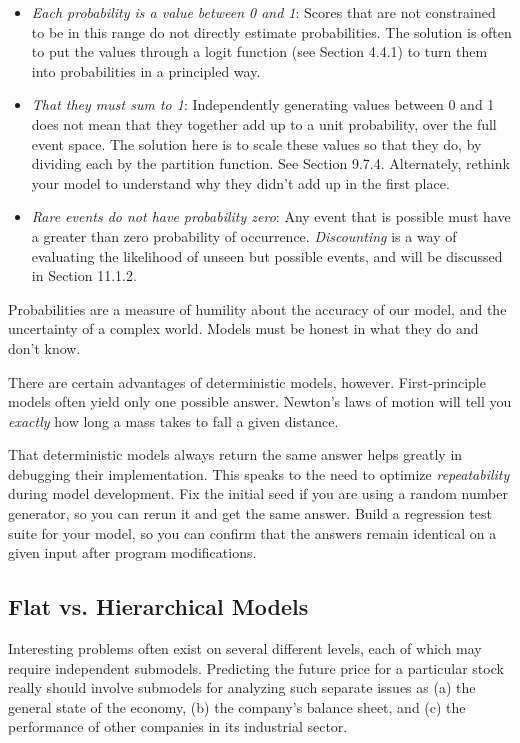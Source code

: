 \documentclass[10pt]{article}
\begin{document}
\begin{itemize}
  \item \textit{Each probability is a value between 0 and 1}: Scores that are not constrained to be in this range do not directly estimate probabilities. The solution is often to put the values through a logit function (see Section 4.4.1) to turn them into probabilities in a principled way.
  \item \textit{That they must sum to 1}: Independently generating values between 0 and 1 does not mean that they together add up to a unit probability, over the full event space. The solution here is to scale these values so that they do, by dividing each by the partition function. See Section 9.7.4. Alternately, rethink your model to understand why they didn’t add up in the first place.
  \item \textit{Rare events do not have probability zero}: Any event that is possible must have a greater than zero probability of occurrence. \textit{Discounting} is a way of evaluating the likelihood of unseen but possible events, and will be discussed in Section 11.1.2.
\end{itemize}

Probabilities are a measure of humility about the accuracy of our model, and the uncertainty of a complex world. Models must be honest in what they do and don’t know.

There are certain advantages of deterministic models, however. First-principle models often yield only one possible answer. Newton’s laws of motion will tell you \textit{exactly} how long a mass takes to fall a given distance.

That deterministic models always return the same answer helps greatly in debugging their implementation. This speaks to the need to optimize \textit{repeatability} during model development. Fix the initial seed if you are using a random number generator, so you can rerun it and get the same answer. Build a regression test suite for your model, so you can confirm that the answers remain identical on a given input after program modifications.

\subsection{Flat vs. Hierarchical Models}

Interesting problems often exist on several different levels, each of which may require independent submodels. Predicting the future price for a particular stock really should involve submodels for analyzing such separate issues as (a) the general state of the economy, (b) the company’s balance sheet, and (c) the performance of other companies in its industrial sector.
\end{document}
